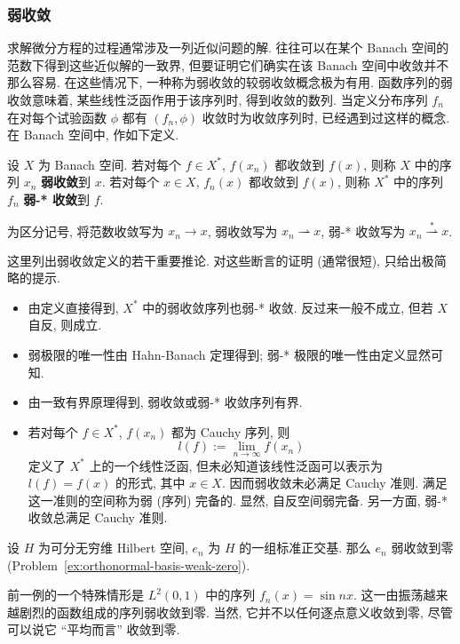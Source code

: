 \subsubsection{弱收敛}\label{subsec:weak-convergence}

求解微分方程的过程通常涉及一列近似问题的解. 往往可以在某个 Banach 空间的范数下得到这些近似解的一致界, 但要证明它们确实在该 Banach 空间中收敛并不那么容易. 在这些情况下, 一种称为弱收敛的较弱收敛概念极为有用. 函数序列的弱收敛意味着, 某些线性泛函作用于该序列时, 得到收敛的数列. 当定义分布序列 $f_n$ 在对每个试验函数 $\phi$ 都有 $(f_n,\phi)$ 收敛时为收敛序列时, 已经遇到过这样的概念. 在 Banach 空间中, 作如下定义.

\begin{Definition}
\label{def:weak-and-weak-star-convergence}
设 $X$ 为 Banach 空间. 若对每个 $f\in X^*$, $f(x_n)$ 都收敛到 $f(x)$, 则称 $X$ 中的序列 $x_n$ \textbf{弱收敛}到 $x$. 若对每个 $x\in X$, $f_n(x)$ 都收敛到 $f(x)$, 则称 $X^*$ 中的序列 $f_n$ \textbf{弱-* 收敛}到 $f$.
\end{Definition}

为区分记号, 将范数收敛写为 $x_n\to x$, 弱收敛写为 $x_n\rightharpoonup x$, 弱-* 收敛写为 $x_n\overset{*}{\rightharpoonup}x$.

\begin{Remark}
\label{rem:weak-convergence-consequences}
这里列出弱收敛定义的若干重要推论. 对这些断言的证明 (通常很短), 只给出极简略的提示.\begin{itemize}
\item 由定义直接得到, $X^*$ 中的弱收敛序列也弱-* 收敛. 反过来一般不成立, 但若 $X$ 自反, 则成立.
\item 弱极限的唯一性由 Hahn-Banach 定理得到; 弱-* 极限的唯一性由定义显然可知.
\item 由一致有界原理得到, 弱收敛或弱-* 收敛序列有界.
\item 若对每个 $f\in X^*$, $f(x_n)$ 都为 Cauchy 序列, 则
\[l(f):=\lim_{n\to\infty}f(x_n)\]
定义了 $X^*$ 上的一个线性泛函, 但未必知道该线性泛函可以表示为 $l(f)=f(x)$ 的形式, 其中 $x\in X$. 因而弱收敛未必满足 Cauchy 准则. 满足这一准则的空间称为弱 (序列) 完备的. 显然, 自反空间弱完备. 另一方面, 弱-* 收敛总满足 Cauchy 准则.
\end{itemize}
\end{Remark}

\begin{Example}
\label{ex:orthonormal-basis-weak-zero-example}
设 $H$ 为可分无穷维 Hilbert 空间, $e_n$ 为 $H$ 的一组标准正交基. 那么 $e_n$ 弱收敛到零 (Problem~\ref{ex:orthonormal-basis-weak-zero}).
\end{Example}

\begin{Example}
\label{ex:oscillatory-sines-weak-zero}
前一例的一个特殊情形是 $L^2(0,1)$ 中的序列 $f_n(x)=\sin nx$. 这一由振荡越来越剧烈的函数组成的序列弱收敛到零. 当然, 它并不以任何逐点意义收敛到零, 尽管可以说它 ``平均而言'' 收敛到零.
\end{Example}
